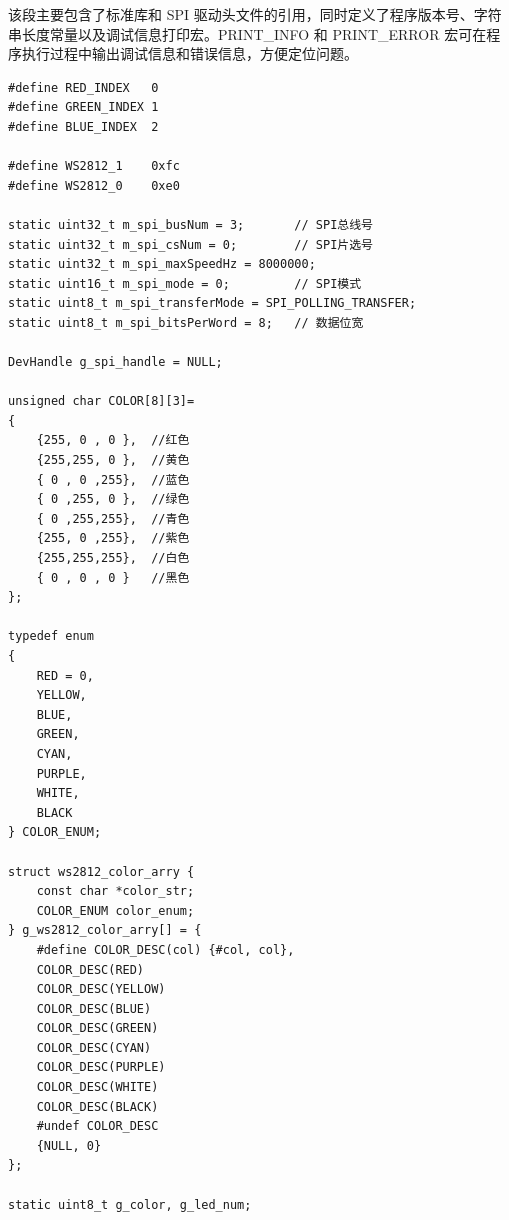 该段主要包含了标准库和 SPI 驱动头文件的引用，同时定义了程序版本号、字符串长度常量以及调试信息打印宏。PRINT_INFO 和 PRINT_ERROR 宏可在程序执行过程中输出调试信息和错误信息，方便定位问题。
\begin{lstlisting}
#define RED_INDEX   0
#define GREEN_INDEX 1
#define BLUE_INDEX  2

#define WS2812_1    0xfc
#define WS2812_0    0xe0

static uint32_t m_spi_busNum = 3;       // SPI总线号
static uint32_t m_spi_csNum = 0;        // SPI片选号
static uint32_t m_spi_maxSpeedHz = 8000000;
static uint16_t m_spi_mode = 0;         // SPI模式
static uint8_t m_spi_transferMode = SPI_POLLING_TRANSFER;
static uint8_t m_spi_bitsPerWord = 8;   // 数据位宽

DevHandle g_spi_handle = NULL;

unsigned char COLOR[8][3]=
{
    {255, 0 , 0 },  //红色
    {255,255, 0 },  //黄色
    { 0 , 0 ,255},  //蓝色
    { 0 ,255, 0 },  //绿色
    { 0 ,255,255},  //青色
    {255, 0 ,255},  //紫色
    {255,255,255},  //白色
    { 0 , 0 , 0 }   //黑色
};

typedef enum
{
    RED = 0,
    YELLOW,
    BLUE,
    GREEN,
    CYAN,
    PURPLE,
    WHITE,
    BLACK
} COLOR_ENUM;

struct ws2812_color_arry {
    const char *color_str;
    COLOR_ENUM color_enum;
} g_ws2812_color_arry[] = {
    #define COLOR_DESC(col) {#col, col},
    COLOR_DESC(RED)
    COLOR_DESC(YELLOW)
    COLOR_DESC(BLUE)
    COLOR_DESC(GREEN)
    COLOR_DESC(CYAN)
    COLOR_DESC(PURPLE)
    COLOR_DESC(WHITE)
    COLOR_DESC(BLACK)
    #undef COLOR_DESC
    {NULL, 0}
};

static uint8_t g_color, g_led_num;
\end{lstlisting}

